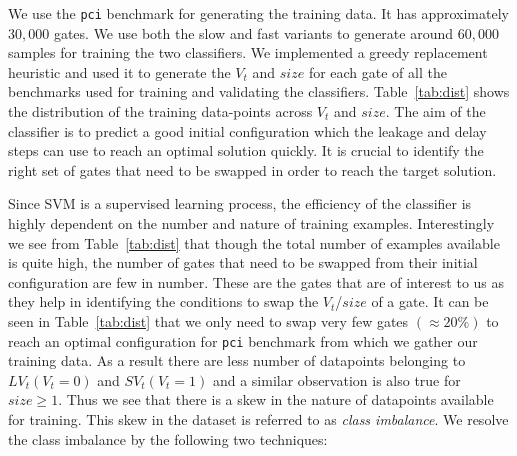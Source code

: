 
We use the \texttt{pci} benchmark for generating the training data. It has approximately $30,000$ gates. We use both the slow and fast variants to generate around $60,000$ samples for training the two classifiers. We implemented a greedy replacement heuristic and used it to generate the $V_t$ and $size$ for each gate of all the benchmarks used for training and validating the classifiers. Table~\ref{tab:dist} shows the distribution of the training data-points across $V_t$ and $size$. The aim of the classifier is to predict a good initial configuration which the leakage and delay  steps can use to reach an optimal solution quickly. It is crucial to identify the right set of gates that need to be swapped in order to reach the target solution. 

Since SVM is a supervised learning process, the efficiency of the classifier is highly dependent on the number and nature of training examples. Interestingly we see from Table~\ref{tab:dist} that though the total number of examples available is quite high, the number of gates that need to be swapped from their initial configuration are few in number. These are the gates that are of interest to us as they help in identifying the conditions to swap the $V_t$/$size$ of a gate. It can be seen in Table~\ref{tab:dist} that  we only need to swap very few gates $(\approx20\%)$ to reach an optimal configuration for \texttt{pci} benchmark from which we gather our training data. As a result there are less number of datapoints belonging to $LV_t (V_t=0)$ and $SV_t (V_t=1)$ and a similar observation is also true for $size\geq1$. Thus we see that there is a skew in the nature of datapoints available for training. This skew in the dataset is referred to as \textit{class imbalance}. We resolve the class imbalance by the following two techniques:



